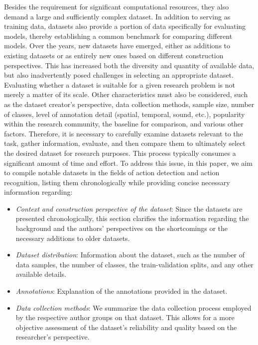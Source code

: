 \documentclass[conference]{IEEEtran}
\begin{document}
Besides the requirement for significant computational resources, they also demand a large and sufficiently complex dataset. In addition to serving as training data, datasets also provide a portion of data specifically for evaluating models, thereby establishing a common benchmark for comparing different models. Over the years, new datasets have emerged, either as additions to existing datasets or as entirely new ones based on different construction perspectives. This has increased both the diversity and quantity of available data, but also inadvertently posed challenges in selecting an appropriate dataset. Evaluating whether a dataset is suitable for a given research problem is not merely a matter of its scale. Other characteristics must also be considered, such as the dataset creator's perspective, data collection methods, sample size, number of classes, level of annotation detail (spatial, temporal, sound, etc.), popularity within the research community, the baseline for comparison, and various other factors. Therefore, it is necessary to carefully examine datasets relevant to the task, gather information, evaluate, and then compare them to ultimately select the desired dataset for research purposes. This process typically consumes a significant amount of time and effort. To address this issue, in this paper, we aim to compile notable datasets in the fields of action detection and action recognition, listing them chronologically while providing concise necessary information regarding:

\begin{itemize}
	\item \textit{Context and construction perspective of the dataset}: Since the datasets are presented chronologically, this section clarifies the information regarding the background and the authors' perspectives on the shortcomings or the necessary additions to older datasets.
	\item \textit{Dataset distribution}: Information about the dataset, such as the number of data samples, the number of classes, the train-validation splits, and any other available details.
	\item \textit{Annotations}: Explanation of the annotations provided in the dataset.
	\item \textit{Data collection methods}: We summarize the data collection process employed by the respective author groups on that dataset. This allows for a more objective assessment of the dataset's reliability and quality based on the researcher's perspective.
\end{itemize}
\end{document}
